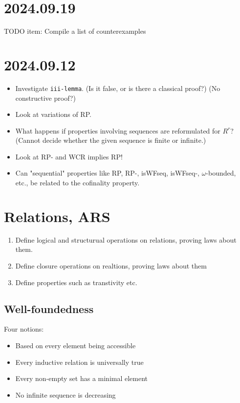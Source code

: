 \documentclass{scrartcl}
\begin{document}
\section{2024.09.19}

TODO item: Compile a list of counterexamples

\section{2024.09.12}
\begin{itemize}
  \item Investigate \texttt{iii-lemma}.  (Is it false, or is there a classical proof?)
  (No constructive proof?)
  \item Look at variations of RP.
  \item What happens if properties involving sequences are reformulated for
  $R^r$? (Cannot decide whether the given sequence is finite or infinite.)
  \item Look at RP- and WCR implies RP!
  \item Can "sequential" properties like RP, RP-, isWFseq, isWFseq-, $\omega$-bounded, etc.,
  be related to the cofinality property.
\end{itemize}

\section{Relations, ARS}


\begin{enumerate}
  \item Define logical and structurual operations on relations, proving laws about them.
  \item Define closure operations on realtions, proving laws about them
  \item Define properties such as transtivity etc.
\end{enumerate}

\subsection{Well-foundedness}

Four notions:
\begin{itemize}
  \item Based on every element being accessible
  \item Every inductive relation is universally true
  \item Every non-empty set has a minimal element
  \item No infinite sequence is decreasing
\end{itemize}
\end{document}
